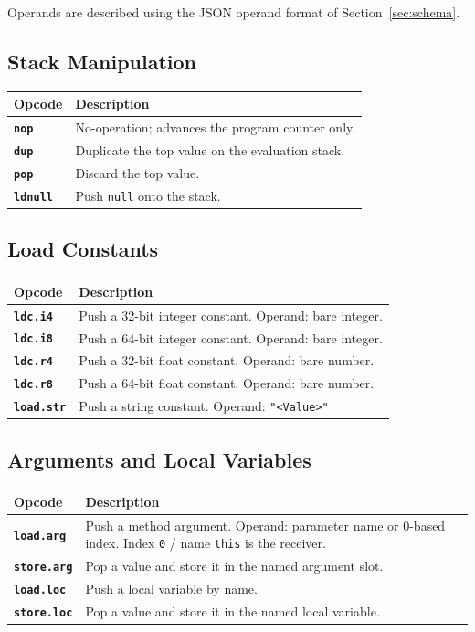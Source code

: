 \documentclass[11pt,a4paper]{article}
\newcommand{\code}[1]{\texttt{\small #1}}
\newcommand{\opcode}[1]{\textbf{\texttt{#1}}}
\begin{document}
Operands are described using the JSON operand format of
Section~\ref{sec:schema}.

\subsection{Stack Manipulation}

\begin{longtable}{lp{10.5cm}}
  \toprule
  \textbf{Opcode} & \textbf{Description} \\
  \midrule
  \endhead
  \opcode{nop}    & No-operation; advances the program counter only. \\
  \opcode{dup}    & Duplicate the top value on the evaluation stack. \\
  \opcode{pop}    & Discard the top value. \\
  \opcode{ldnull} & Push \texttt{null} onto the stack. \\
  \bottomrule
\end{longtable}

\subsection{Load Constants}

\begin{longtable}{lp{10.5cm}}
  \toprule
  \textbf{Opcode} & \textbf{Description} \\
  \midrule
  \endhead
  \opcode{ldc.i4} & Push a 32-bit integer constant. Operand: bare integer. \\
  \opcode{ldc.i8} & Push a 64-bit integer constant. Operand: bare integer. \\
  \opcode{ldc.r4} & Push a 32-bit float constant. Operand: bare number. \\
  \opcode{ldc.r8} & Push a 64-bit float constant. Operand: bare number. \\
  \opcode{load.str}  &
    Push a string constant.
    Operand: \code{"<Value>"} \\
  \bottomrule
\end{longtable}

\subsection{Arguments and Local Variables}

\begin{longtable}{lp{10.5cm}}
  \toprule
  \textbf{Opcode} & \textbf{Description} \\
  \midrule
  \endhead
  \opcode{load.arg}  &
    Push a method argument.
    Operand: parameter name or 0-based index.
    Index \texttt{0} / name \texttt{this} is the receiver. \\
  \opcode{store.arg}  & Pop a value and store it in the named argument slot. \\
  \opcode{load.loc}  & Push a local variable by name. \\
  \opcode{store.loc}  & Pop a value and store it in the named local variable. \\
  \bottomrule
\end{longtable}
\end{document}
